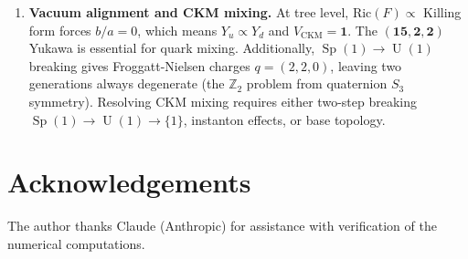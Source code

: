 \documentclass[12pt,a4paper]{article}
\theoremstyle{definition}
\newcommand{\Sp}{\operatorname{Sp}}
\newcommand{\U}{\operatorname{U}}
\newcommand{\Z}{\mathbb{Z}}
\begin{document}
\begin{enumerate}
\item \textbf{Vacuum alignment and CKM mixing.}
At tree level, Ric$(F) \propto$ Killing form forces $b/a = 0$, which means $Y_u \propto Y_d$ and $V_{\mathrm{CKM}} = \mathbf{1}$.
The $(\mathbf{15},\mathbf{2},\mathbf{2})$ Yukawa is essential for quark mixing.
Additionally, $\Sp(1) \to \U(1)$ breaking gives Froggatt-Nielsen charges $q = (2,2,0)$, leaving two generations always degenerate (the $\Z_2$ problem from quaternion $S_3$ symmetry).
Resolving CKM mixing requires either two-step breaking $\Sp(1) \to \U(1) \to \{1\}$, instanton effects, or base topology.
\end{enumerate}


\section*{Acknowledgements}

The author thanks Claude (Anthropic) for assistance with verification of the numerical computations.




\end{document}
